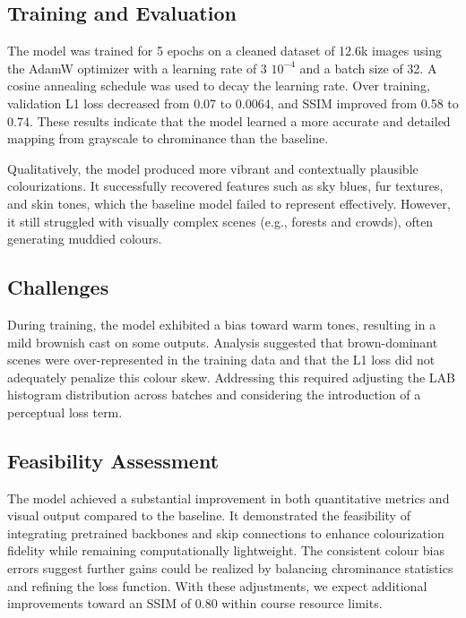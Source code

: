 \documentclass{article} %
\begin{document}
\subsection{Training and Evaluation}

The model was trained for 5 epochs on a cleaned dataset of 12.6k images using the AdamW optimizer with a learning rate of 3 \texttimes $10^{-4}$ and a batch size of 32. A cosine annealing schedule was used to decay the learning rate. Over training, validation L1 loss decreased from 0.07 to 0.0064, and SSIM improved from 0.58 to 0.74. These results indicate that the model learned a more accurate and detailed mapping from grayscale to chrominance than the baseline.

Qualitatively, the model produced more vibrant and contextually plausible colourizations. It successfully recovered features such as sky blues, fur textures, and skin tones, which the baseline model failed to represent effectively. However, it still struggled with visually complex scenes (e.g., forests and crowds), often generating muddied colours.

\subsection{Challenges}

During training, the model exhibited a bias toward warm tones, resulting in a mild brownish cast on some outputs. Analysis suggested that brown-dominant scenes were over-represented in the training data and that the L1 loss did not adequately penalize this colour skew. Addressing this required adjusting the LAB histogram distribution across batches and considering the introduction of a perceptual loss term.

\subsection{Feasibility Assessment}

The model achieved a substantial improvement in both quantitative metrics and visual output compared to the baseline. It demonstrated the feasibility of integrating pretrained backbones and skip connections to enhance colourization fidelity while remaining computationally lightweight. The consistent colour bias errors suggest further gains could be realized by balancing chrominance statistics and refining the loss function. With these adjustments, we expect additional improvements toward an SSIM of 0.80 within course resource limits.
\end{document}
